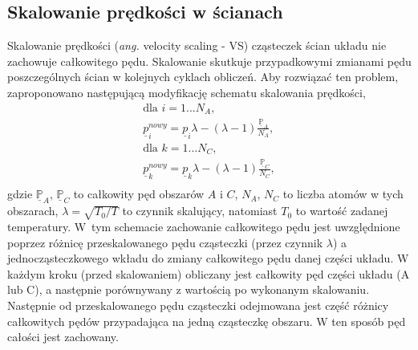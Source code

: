 \documentclass[12pt,a4paper,openright]{report} %
\begin{document}
\subsection{Skalowanie prędkości w ścianach}
\label{skal_pr}
% 
Skalowanie prędkości (\textit{ang.} velocity scaling - VS) \cite{Woodcock1971} cząsteczek ścian układu nie zachowuje całkowitego pędu. Skalowanie skutkuje przypadkowymi zmianami pędu poszczególnych ścian w kolejnych cyklach obliczeń. Aby rozwiązać ten problem, zaproponowano następującą modyfikację schematu skalowania prędkości, 
\begin{equation}
\begin{gathered}
\text{dla } i=1...N_A, \\
\underline{p}^{nowy}_i= \underline{p}_i \lambda -
{\left(\lambda -1 \right)}\frac{\underline{\mathbb{P}}_{A}}{N_A}, \\
\text{dla } k=1...N_C, \\
\underline{p}^{nowy}_k= \underline{p}_k \lambda -
{\left(\lambda -1 \right)}\frac{\underline{\mathbb{P}}_{C}}{N_C}, \\
\end{gathered}
\label{skal_pr_moj}
\end{equation}
gdzie $\underline{\mathbb{P}}_{A}$, $\underline{\mathbb{P}}_{C}$ to całkowity pęd obszarów $A$ i $C$, $N_A$, $N_C$ to liczba atomów w tych obszarach, $\lambda=\sqrt{T_0/T}$ to czynnik skalujący, natomiast $T_{0}$ to wartość zadanej temperatury. W~tym schemacie zachowanie całkowitego pędu jest uwzględnione poprzez różnicę przeskalowanego pędu cząsteczki (przez czynnik $\lambda$) a jednocząsteczkowego wkładu do zmiany całkowitego pędu danej części układu. W każdym kroku (przed skalowaniem) obliczany jest całkowity pęd części układu (A lub C), a następnie porównywany z wartością po wykonanym skalowaniu. Następnie od przeskalowanego pędu cząsteczki odejmowana jest część różnicy całkowitych pędów przypadająca na jedną cząsteczkę obszaru. W ten sposób pęd całości jest zachowany. 
%
\end{document}
